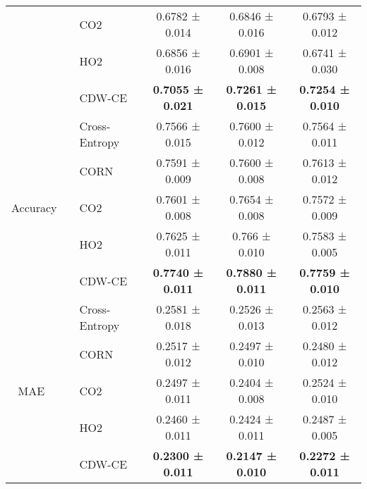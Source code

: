 \documentclass[runningheads]{llncs}
\begin{document}
\begin{table}[t!]
\begin{adjustbox}{center}
\begin{tabular}{cllccc}
                          &                      & CO2                                        & 0.6782 ± 0.014          & 0.6846 ± 0.016          & 0.6793 ± 0.012               \\
                          &                      & HO2                                        & 0.6856 ± 0.016          & 0.6901 ± 0.008          & 0.6741 ± 0.030               \\
                          &                      & CDW-CE                                     & \textbf{0.7055 ± 0.021} & \textbf{0.7261 ± 0.015} & \textbf{0.7254 ± 0.010}      \\ 
\hline
\multirow{5}{*}{Accuracy} &                      & Cross-Entropy                              & 0.7566 ± 0.015          & 0.7600 ± 0.012          & 0.7564 ± 0.011               \\
                          &                      & CORN                                       & 0.7591 ± 0.009          & 0.7600 ± 0.008          & 0.7613 ± 0.012               \\
                          &                      & CO2                                        & 0.7601 ± 0.008          & 0.7654 ± 0.008          & 0.7572 ± 0.009               \\
                          &                      & HO2                                        & 0.7625 ± 0.011          & 0.766 ± 0.010           & 0.7583 ± 0.005               \\
                          &                      & CDW-CE                                     & \textbf{0.7740 ± 0.011} & \textbf{0.7880 ± 0.011} & \textbf{0.7759 ± 0.010}      \\ 
\hline
\multirow{5}{*}{MAE~}     &                      & Cross-Entropy                              & 0.2581 ± 0.018          & 0.2526 ± 0.013          & 0.2563 ± 0.012               \\
                          &                      & CORN                                       & 0.2517 ± 0.012          & 0.2497 ± 0.010          & 0.2480 ± 0.012               \\
                          &                      & CO2                                        & 0.2497 ± 0.011          & 0.2404 ± 0.008          & 0.2524 ± 0.010               \\
                          &                      & HO2                                        & 0.2460 ± 0.011          & 0.2424 ± 0.011          & 0.2487 ± 0.005               \\
                          &                      & CDW-CE                                     & \textbf{0.2300 ± 0.011} & \textbf{0.2147 ± 0.010} & \textbf{0.2272 ± 0.011}      \\
\hline
\end{tabular}
\end{adjustbox}
\end{table}
\end{document}
